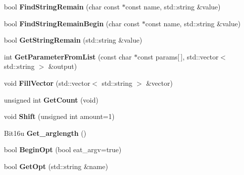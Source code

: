 \begin{DoxyCompactItemize}
\item 
\hypertarget{classCommandLine_a8995713eff76c14e1d53ec0515d833d6}{bool {\bfseries Find\-String\-Remain} (char const $\ast$const name, std\-::string \&value)}\label{classCommandLine_a8995713eff76c14e1d53ec0515d833d6}

\item 
\hypertarget{classCommandLine_a791da6ab1876316f66f545a31cee69e5}{bool {\bfseries Find\-String\-Remain\-Begin} (char const $\ast$const name, std\-::string \&value)}\label{classCommandLine_a791da6ab1876316f66f545a31cee69e5}

\item 
\hypertarget{classCommandLine_abdba027c787d2b5a70dee1e842c699dd}{bool {\bfseries Get\-String\-Remain} (std\-::string \&value)}\label{classCommandLine_abdba027c787d2b5a70dee1e842c699dd}

\item 
\hypertarget{classCommandLine_ac5b6c005e5f124ab3a1a7de6db8a86d3}{int {\bfseries Get\-Parameter\-From\-List} (const char $\ast$const params\mbox{[}$\,$\mbox{]}, std\-::vector$<$ std\-::string $>$ \&output)}\label{classCommandLine_ac5b6c005e5f124ab3a1a7de6db8a86d3}

\item 
\hypertarget{classCommandLine_a694f00846c0832d8cd97fe0a652d5567}{void {\bfseries Fill\-Vector} (std\-::vector$<$ std\-::string $>$ \&vector)}\label{classCommandLine_a694f00846c0832d8cd97fe0a652d5567}

\item 
\hypertarget{classCommandLine_aec22173334fc0db4e350b3475a162f1a}{unsigned int {\bfseries Get\-Count} (void)}\label{classCommandLine_aec22173334fc0db4e350b3475a162f1a}

\item 
\hypertarget{classCommandLine_aea42d5fe141ba6c58ef7045eb3b92f3e}{void {\bfseries Shift} (unsigned int amount=1)}\label{classCommandLine_aea42d5fe141ba6c58ef7045eb3b92f3e}

\item 
\hypertarget{classCommandLine_ab4e8866df99dac127353b303b95014ee}{Bit16u {\bfseries Get\-\_\-arglength} ()}\label{classCommandLine_ab4e8866df99dac127353b303b95014ee}

\item 
\hypertarget{classCommandLine_ad1780afea11368a1e6fdd35276a8c678}{bool {\bfseries Begin\-Opt} (bool eat\-\_\-argv=true)}\label{classCommandLine_ad1780afea11368a1e6fdd35276a8c678}

\item 
\hypertarget{classCommandLine_a4440913abd4b9f06635b3df3fe0ee7d4}{bool {\bfseries Get\-Opt} (std\-::string \&name)}\label{classCommandLine_a4440913abd4b9f06635b3df3fe0ee7d4}


\end{DoxyCompactItemize}
